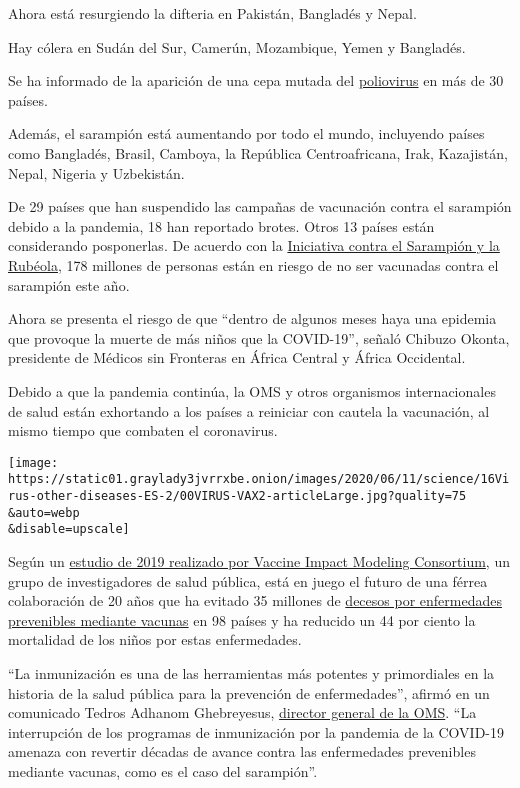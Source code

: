 Ahora está resurgiendo la difteria en Pakistán, Bangladés y Nepal.

Hay cólera en Sudán del Sur, Camerún, Mozambique, Yemen y Bangladés.

Se ha informado de la aparición de una cepa mutada del
\href{http://polioeradication.org/}{poliovirus} en más de 30 países.

Además, el sarampión está aumentando por todo el mundo, incluyendo
países como Bangladés, Brasil, Camboya, la República Centroafricana,
Irak, Kazajistán, Nepal, Nigeria y Uzbekistán.

De 29 países que han suspendido las campañas de vacunación contra el
sarampión debido a la pandemia, 18 han reportado brotes. Otros 13 países
están considerando posponerlas. De acuerdo con la
\href{https://measlesrubellainitiative.org/}{Iniciativa contra el
Sarampión y la Rubéola}, 178 millones de personas están en riesgo de no
ser vacunadas contra el sarampión este año.

Ahora se presenta el riesgo de que ``dentro de algunos meses haya una
epidemia que provoque la muerte de más niños que la COVID-19'', señaló
Chibuzo Okonta, presidente de Médicos sin Fronteras en África Central y
África Occidental.

Debido a que la pandemia continúa, la OMS y otros organismos
internacionales de salud están exhortando a los países a reiniciar con
cautela la vacunación, al mismo tiempo que combaten el coronavirus.

\texttt{[image: https://static01.graylady3jvrrxbe.onion/images/2020/06/11/science/16Virus-other-diseases-ES-2/00VIRUS-VAX2-articleLarge.jpg?quality=75\\\&auto=webp\\\&disable=upscale]}

Según un
\href{https://www.vaccineimpact.org/resources/VIMC_impact_estimates-03Sep19.html}{estudio
de 2019 realizado por Vaccine Impact Modeling Consortium}, un grupo de
investigadores de salud pública, está en juego el futuro de una férrea
colaboración de 20 años que ha evitado 35 millones de
\href{https://www.gavi.org/programmes-impact/types-support/vaccine-support}{decesos
por enfermedades prevenibles mediante vacunas} en 98 países y ha
reducido un 44 por ciento la mortalidad de los niños por estas
enfermedades.

``La inmunización es una de las herramientas más potentes y primordiales
en la historia de la salud pública para la prevención de enfermedades'',
afirmó en un comunicado Tedros Adhanom Ghebreyesus,
\href{https://www.who.int/dg}{director general de la OMS}. ``La
interrupción de los programas de inmunización por la pandemia de la
COVID-19 amenaza con revertir décadas de avance contra las enfermedades
prevenibles mediante vacunas, como es el caso del sarampión''.

